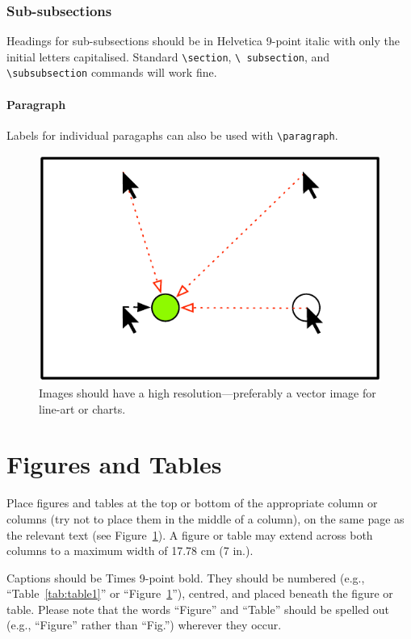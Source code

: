 \documentclass[preprint]{../latex/sigchi-modern}
\begin{document}
\subsubsection{Sub-subsections}
Headings for sub-subsections should be in Helvetica 9-point italic with only the
initial letters capitalised.
Standard \texttt{\textbackslash sec\-tion}, \texttt{\textbackslash
subsection}, and \texttt{\textbackslash subsubsection} commands will work fine.

\paragraph{Paragraph} Labels for individual paragaphs can also be used with
\texttt{\textbackslash paragraph}.

\begin{figure}
  \centering
  \includegraphics[width=0.9\columnwidth]{figure}
  \caption{Images should have a high resolution---preferably a vector image 
      for line-art or charts.}
  \label{fig:sample}
\end{figure}

\section{Figures and Tables}
Place figures and tables at the top or bottom of the appropriate column or
columns (try not to place them in the middle of a column), on the same page as
the relevant text (see Figure~\ref{fig:sample}). A figure or table may extend
across both columns to a maximum width of 17.78 cm (7 in.).

Captions should be Times 9-point bold. They should be numbered (e.g.,
``Table~\ref{tab:table1}'' or ``Figure~\ref{fig:sample}''), centred, and placed
beneath the figure or table. Please note that the words ``Figure'' and ``Table''
should be spelled out (e.g., ``Figure'' rather than ``Fig.'') wherever they
occur.
\end{document}

